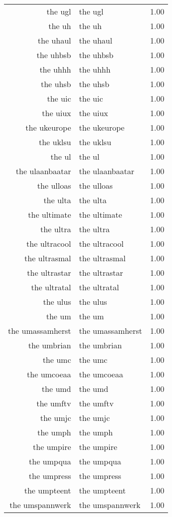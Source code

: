\begin{table}[ht]
\begin{tabular}{rlr}
  the ugl & the ugl & 1.00 \\ 
  the uh & the uh & 1.00 \\ 
  the uhaul & the uhaul & 1.00 \\ 
  the uhbsb & the uhbsb & 1.00 \\ 
  the uhhh & the uhhh & 1.00 \\ 
  the uhsb & the uhsb & 1.00 \\ 
  the uic & the uic & 1.00 \\ 
  the uiux & the uiux & 1.00 \\ 
  the ukeurope & the ukeurope & 1.00 \\ 
  the uklsu & the uklsu & 1.00 \\ 
  the ul & the ul & 1.00 \\ 
  the ulaanbaatar & the ulaanbaatar & 1.00 \\ 
  the ulloas & the ulloas & 1.00 \\ 
  the ulta & the ulta & 1.00 \\ 
  the ultimate & the ultimate & 1.00 \\ 
  the ultra & the ultra & 1.00 \\ 
  the ultracool & the ultracool & 1.00 \\ 
  the ultrasmal & the ultrasmal & 1.00 \\ 
  the ultrastar & the ultrastar & 1.00 \\ 
  the ultratal & the ultratal & 1.00 \\ 
  the ulus & the ulus & 1.00 \\ 
  the um & the um & 1.00 \\ 
  the umassamherst & the umassamherst & 1.00 \\ 
  the umbrian & the umbrian & 1.00 \\ 
  the umc & the umc & 1.00 \\ 
  the umcoeaa & the umcoeaa & 1.00 \\ 
  the umd & the umd & 1.00 \\ 
  the umftv & the umftv & 1.00 \\ 
  the umjc & the umjc & 1.00 \\ 
  the umph & the umph & 1.00 \\ 
  the umpire & the umpire & 1.00 \\ 
  the umpqua & the umpqua & 1.00 \\ 
  the umpress & the umpress & 1.00 \\ 
  the umpteent & the umpteent & 1.00 \\ 
  the umspannwerk & the umspannwerk & 1.00 \\ 

\end{tabular}
\end{table}
